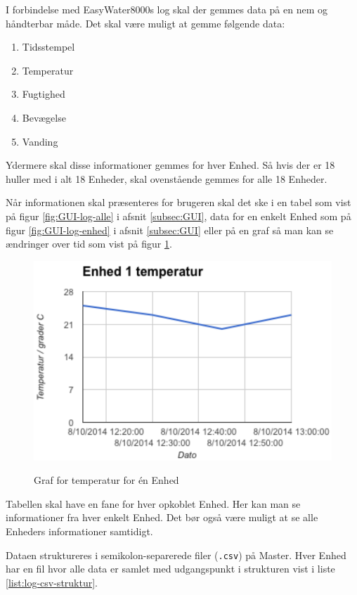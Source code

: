 
I forbindelse med EasyWater8000s log skal der gemmes data på en nem og håndterbar måde. Det skal være muligt at gemme følgende data:

\begin{enumerate}
	\item Tidsstempel
	\item Temperatur
	\item Fugtighed
	\item Bevægelse
	\item Vanding
\end{enumerate}

Ydermere skal disse informationer gemmes for hver Enhed. Så hvis der er 18 huller med i alt 18 Enheder, skal ovenstående gemmes for alle 18 Enheder.

Når informationen skal præsenteres for brugeren skal det ske i en tabel som vist på figur \ref{fig:GUI-log-alle} i afsnit \ref{subsec:GUI}, data for en enkelt Enhed som på figur \ref{fig:GUI-log-enhed} i afsnit \ref{subsec:GUI} eller på en graf så man kan se ændringer over tid som vist på figur \ref{fig:log-graf}.

\begin{figure}[htbp] \centering
{\includegraphics[scale=0.5]{filer/pics/SW-Log-graf}}
\caption{Graf for temperatur for én Enhed}
\label{fig:log-graf}
\end{figure}

Tabellen skal have en fane for hver opkoblet Enhed. Her kan man se informationer fra hver enkelt Enhed. Det bør også være muligt at se alle Enheders informationer samtidigt.

Dataen struktureres i semikolon-separerede filer (\verb+.csv+) på Master. Hver Enhed har en fil hvor alle data er samlet med udgangspunkt i strukturen vist i liste \ref{list:log-csv-struktur}.

